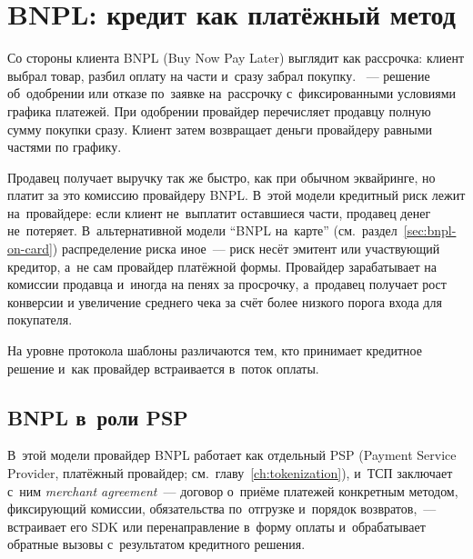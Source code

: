 
\chapter{BNPL: кредит как платёжный метод}\label{ch:bnpl}
Со стороны клиента BNPL (Buy Now Pay Later) выглядит как рассрочка:
клиент выбрал товар, разбил оплату на части и~сразу забрал покупку.
~--- решение об~одобрении или отказе по~заявке
на~рассрочку с~фиксированными условиями графика платежей. При одобрении
провайдер перечисляет продавцу полную сумму покупки сразу. Клиент затем
возвращает деньги провайдеру равными частями по графику.

Продавец получает выручку так же быстро, как при обычном эквайринге,
но платит за это комиссию провайдеру BNPL. В~этой модели кредитный риск
лежит на~провайдере: если клиент не~выплатит оставшиеся части, продавец
денег не~потеряет. В~альтернативной модели \enquote{BNPL на~карте}
(см.~раздел~\ref{sec:bnpl-on-card}) распределение риска иное~--- риск
несёт эмитент или участвующий кредитор, а~не сам провайдер платёжной
формы. Провайдер зарабатывает на комиссии продавца
и~иногда на пенях за просрочку, а~продавец получает рост конверсии
и увеличение среднего чека за счёт более низкого порога входа
для покупателя.

На уровне протокола шаблоны различаются тем, кто принимает
кредитное решение и~как провайдер встраивается в~поток оплаты.

\section{BNPL в~роли PSP}\label{sec:bnpl-as-psp}

В~этой модели провайдер BNPL работает как отдельный PSP (Payment Service
Provider, платёжный провайдер; см.~главу~\ref{ch:tokenization}), и~ТСП
заключает с~ним \textit{merchant agreement}~--- договор о~приёме платежей
конкретным методом, фиксирующий комиссии, обязательства по~отгрузке
и~порядок возвратов,~--- встраивает его SDK или перенаправление в~форму
оплаты и~обрабатывает обратные вызовы с~результатом кредитного решения.

